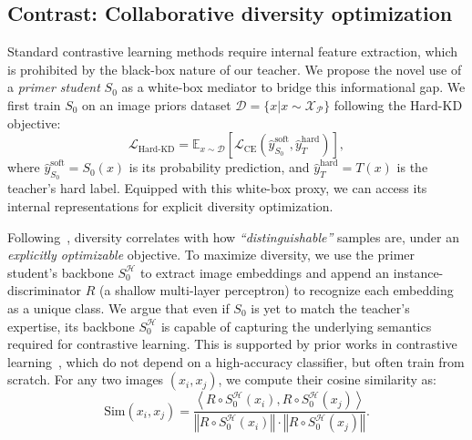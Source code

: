 \subsection{Contrast: Collaborative diversity optimization} \label{sec:43-research02-framework-contrast}
\begin{foldable} %
  Standard contrastive learning methods require internal feature extraction, which is prohibited by the black-box nature of our teacher.
  We propose the novel use of a \textit{primer student} $S_{0}$ as a white-box mediator to bridge this informational gap.
  We first train $S_{0}$ on an image priors dataset $\mathcal{D} = \{x | x \sim \mathcal{X}_\mathcal{P}\}$ following the Hard-KD objective:
  \begin{equation} \label{eq:loss-hard-kd}
    \mathcal{L}_\text{Hard-KD} = \mathbb{E}_{x \sim \mathcal{D}} \left[\mathcal{L}_\text{CE} \left(\hat{y}_{S_0}^\text{soft}, \hat{y}_{T}^\text{hard} \right)\right],
  \end{equation}
  where $\hat{y}_{S_0}^\text{soft} = S_0(x)$ is its probability prediction, and $\hat{y}_{T}^\text{hard} = T(x)$ is the teacher's hard label.
  Equipped with this white-box proxy, we can access its internal representations for explicit diversity optimization.
\end{foldable}

\begin{foldable} %
  Following~\cite{fang2021contrastive}, diversity correlates with how \textit{``distinguishable''} samples are, under an \textit{explicitly optimizable} objective.
  To maximize diversity, we use the primer student's backbone $S_{0}^\mathcal{H}$ to extract image embeddings and append an instance-discriminator $R$ (a shallow multi-layer perceptron) to recognize each embedding as a unique class.
  We argue that even if $S_0$ is yet to match the teacher's expertise, its backbone $S_{0}^\mathcal{H}$ is capable of capturing the underlying semantics required for contrastive learning.
  This is supported by prior works in contrastive learning~\cite{chen2020simple,he2020momentum,zbontar2021barlow}, which do not depend on a high-accuracy classifier, but often train from scratch.
  For any two images $(x_i, x_j)$, we compute their cosine similarity as:
  \begin{equation}
    \text{Sim}\left(x_i, x_j\right)=
    \frac{ \left\langle R \circ S_{0}^\mathcal{H}(x_i), R \circ S_{0}^\mathcal{H}(x_j)\right\rangle }
    { \left\Vert R \circ S_{0}^\mathcal{H}(x_i) \right\Vert \cdot \left\Vert R \circ S_{0}^\mathcal{H}(x_j) \right\Vert }.
  \end{equation}
\end{foldable}

